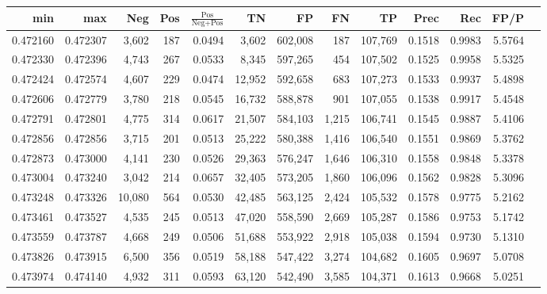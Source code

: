 \begin{tabular}{rrrrrrrrrrrrr}
\toprule
     min &      max &    Neg &   Pos & $\frac{\text{Pos}}{\text{Neg}+\text{Pos}}$ &      TN &      FP &      FN &      TP &   Prec &    Rec &   FP/P \\
\midrule
0.472160 & 0.472307 &  3,602 &   187 &                                     0.0494 &   3,602 & 602,008 &     187 & 107,769 & 0.1518 & 0.9983 & 5.5764 \\
0.472330 & 0.472396 &  4,743 &   267 &                                     0.0533 &   8,345 & 597,265 &     454 & 107,502 & 0.1525 & 0.9958 & 5.5325 \\
0.472424 & 0.472574 &  4,607 &   229 &                                     0.0474 &  12,952 & 592,658 &     683 & 107,273 & 0.1533 & 0.9937 & 5.4898 \\
0.472606 & 0.472779 &  3,780 &   218 &                                     0.0545 &  16,732 & 588,878 &     901 & 107,055 & 0.1538 & 0.9917 & 5.4548 \\
0.472791 & 0.472801 &  4,775 &   314 &                                     0.0617 &  21,507 & 584,103 &   1,215 & 106,741 & 0.1545 & 0.9887 & 5.4106 \\
0.472856 & 0.472856 &  3,715 &   201 &                                     0.0513 &  25,222 & 580,388 &   1,416 & 106,540 & 0.1551 & 0.9869 & 5.3762 \\
0.472873 & 0.473000 &  4,141 &   230 &                                     0.0526 &  29,363 & 576,247 &   1,646 & 106,310 & 0.1558 & 0.9848 & 5.3378 \\
0.473004 & 0.473240 &  3,042 &   214 &                                     0.0657 &  32,405 & 573,205 &   1,860 & 106,096 & 0.1562 & 0.9828 & 5.3096 \\
0.473248 & 0.473326 & 10,080 &   564 &                                     0.0530 &  42,485 & 563,125 &   2,424 & 105,532 & 0.1578 & 0.9775 & 5.2162 \\
0.473461 & 0.473527 &  4,535 &   245 &                                     0.0513 &  47,020 & 558,590 &   2,669 & 105,287 & 0.1586 & 0.9753 & 5.1742 \\
0.473559 & 0.473787 &  4,668 &   249 &                                     0.0506 &  51,688 & 553,922 &   2,918 & 105,038 & 0.1594 & 0.9730 & 5.1310 \\
0.473826 & 0.473915 &  6,500 &   356 &                                     0.0519 &  58,188 & 547,422 &   3,274 & 104,682 & 0.1605 & 0.9697 & 5.0708 \\
0.473974 & 0.474140 &  4,932 &   311 &                                     0.0593 &  63,120 & 542,490 &   3,585 & 104,371 & 0.1613 & 0.9668 & 5.0251 \\

\end{tabular}
